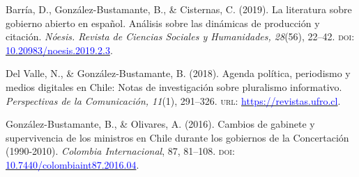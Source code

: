 \begin{publications}
\begin{benumerate}{10}
\item{\small Barría, D., González-Bustamante, B., \& Cisternas, C. (2019). La literatura sobre gobierno abierto en español. Análisis sobre las dinámicas de producción y citación. {\itshape Nóesis. Revista de Ciencias Sociales y Humanidades, 28}(56), 22--42. {\scshape doi}: \href{http://dx.doi.org/10.20983/noesis.2019.2.3}{\textcolor{blue}{10.20983/noesis.2019.2.3}}.}\vspace{1mm}


\item{\small Del Valle, N., \& González-Bustamante, B. (2018). Agenda política, periodismo y medios digitales en Chile: Notas de investigación sobre pluralismo informativo. {\itshape Perspectivas de la Comunicación, 11}(1), 291--326. {\scshape url:} \href{https://revistas.ufro.cl/ojs/index.php/perspectivas/article/view/1146}{\textcolor{blue}{https://revistas.ufro.cl}}.}\vspace{1mm}


\item{\small González-Bustamante, B., \& Olivares, A. (2016). Cambios de gabinete y supervivencia de los ministros en Chile durante los gobiernos de la Concertación (1990-2010). {\itshape Colombia Internacional}, 87, 81--108. {\scshape doi}: \\ \href{https://doi.org/10.7440/colombiaint87.2016.04}{\textcolor{blue}{10.7440/colombiaint87.2016.04}}.}\vspace{1mm}



\end{benumerate}
\end{publications}

